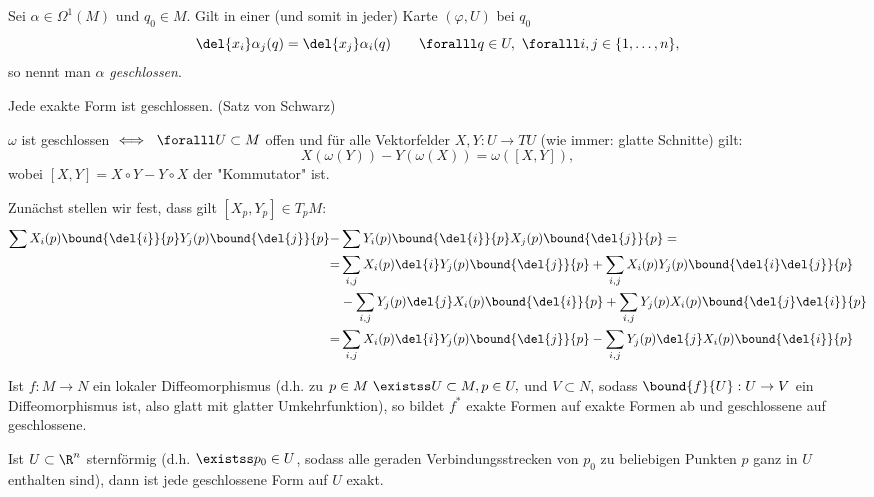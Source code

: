 \begin{defn}
	Sei $ \alpha \in \Omega^1(M) $ und $q_0 \in M$. Gilt in einer (und somit in jeder) Karte $ (\varphi,U)$ bei $ q_0 $
	\[ \del{x_i} \alpha_j (q) = \del{x_j} \alpha_i(q) \qquad \foralll q \in U,\ \foralll i,j \in \{1,\dotsc,n\}, \]
	so nennt man $\alpha$ \emph{geschlossen}.
\end{defn}

\begin{rem*}
	Jede exakte Form ist geschlossen. (Satz von Schwarz)
\end{rem*}

\begin{lem}
	$\omega$ ist geschlossen $\iff \ \foralll U \subset M$ offen und für alle Vektorfelder $X,Y: U \to TU$ (wie immer: glatte Schnitte) gilt:
	\[ X(\omega(Y)) - Y(\omega(X)) = \omega([X,Y]), \]
	wobei $[X,Y] = X \circ Y - Y \circ X$ der "Kommutator" ist.
\end{lem}

\begin{rem*}
	Zunächst stellen wir fest, dass gilt $ [X_p,Y_p] \in T_pM: $
	\begin{align*}
		\sum X_i(p) \bound{\del{i}}{p} Y_j(p) \bound{\del{j}}{p} -& \sum Y_i(p) \bound{\del{i}}{p} X_j(p) \bound{\del{j}}{p} = \\
		=&\sum_{i,j} X_i(p) \del{i} Y_j(p) \bound{\del{j}}{p} + \sum_{i,j} X_i(p) Y_j(p) \bound{\del{i} \del{j}}{p}\\
		&- \sum_{i,j} Y_j(p) \del{j} X_i(p) \bound{\del{i}}{p} + \sum_{i,j} Y_j(p) X_i(p) \bound{\del{j} \del{i}}{p}\\
		=& \sum_{i,j} X_i(p) \del{i} Y_j(p) \bound{\del{j}}{p} - \sum_{i,j} Y_j(p) \del{j} X_i(p) \bound{\del{i}}{p}
	\end{align*}
\end{rem*}

\begin{rem}
	Ist $ f: M \to N $ ein lokaler Diffeomorphismus (d.h. zu $p \in M \ \existss U \subset M, p \in U,$ und $V \subset N$, sodass $ \bound{f}{U}: U \to V $ ein Diffeomorphismus ist, also glatt mit glatter Umkehrfunktion), so bildet $f^*$ exakte Formen auf exakte Formen ab und geschlossene auf geschlossene.
\end{rem}

\begin{thm}\label{3.40}
	\begin{minipage}{\linewidth}
		\begin{wrapfigure}{R}{5cm}
			\centering
		\end{wrapfigure}
		
		Ist $ U \subset \R^n $ sternförmig (d.h. $\existss p_0 \in U$, sodass alle geraden Verbindungsstrecken von $p_0$ zu beliebigen Punkten $p$ ganz in $U$ enthalten sind), dann ist jede geschlossene Form auf $U$ exakt.
	\end{minipage}
\end{thm}

